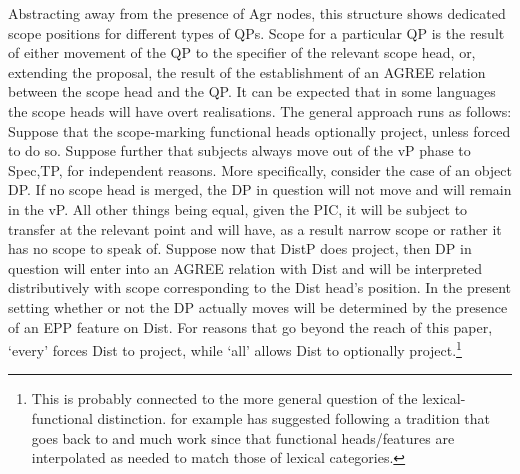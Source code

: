 \documentclass[charis]{glossa}
\begin{document}
Abstracting away from the presence of Agr nodes, this structure shows dedicated scope positions for different types of QPs.  Scope for a particular QP is the result of either movement of the QP to the specifier of the relevant scope head, or, extending the proposal, the result of the establishment of an AGREE relation between the scope head and the QP.  It can be expected that in some languages the scope heads will have overt realisations.  The general approach runs as follows:  Suppose that the scope-marking functional heads optionally project, unless forced to do so.  Suppose further that subjects always move out of the vP phase to Spec,TP, for independent reasons.
More specifically, consider the case of an object DP.  If no scope head is merged, the DP in question will not move and will remain in the vP.   All other things being equal, given the  PIC, it will be subject to transfer at the relevant point and will have, as a result narrow scope or rather it has no scope to speak of. Suppose now that DistP does project, then DP in question will enter into an AGREE relation with Dist and will be  interpreted distributively with scope corresponding to the Dist head's position.  In the present setting whether or not the DP actually moves will be determined by the presence of an EPP feature on Dist.
For reasons that go beyond the reach of this paper, `every' forces Dist to project, while `all' allows Dist to optionally project.\footnote{This is probably connected to the more general question of the lexical-functional distinction. \cite{hegarty:93,hegarty:05} for example has suggested following a tradition that goes back to \citet{abney:87} and much work since that functional heads/features are interpolated  as needed to match those of lexical categories.}
  
\end{document}
